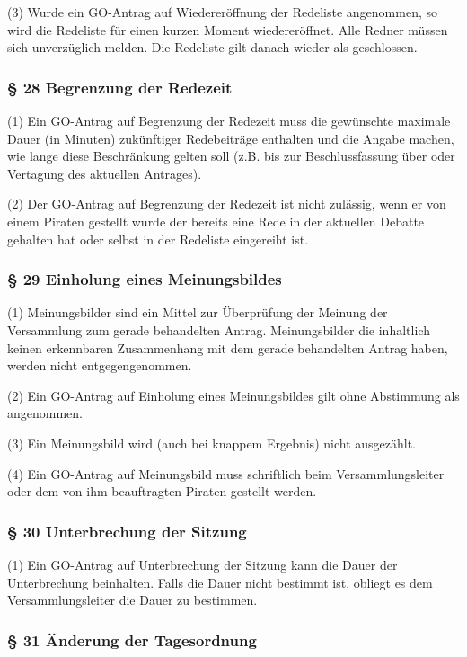 (3) Wurde ein GO-Antrag auf Wiedereröffnung der Redeliste angenommen, so
wird die Redeliste für einen kurzen Moment wiedereröffnet. Alle Redner
müssen sich unverzüglich melden. Die Redeliste gilt danach wieder als
geschlossen.

\subsubsection{§ 28 Begrenzung der Redezeit}

(1) Ein GO-Antrag auf Begrenzung der Redezeit muss die gewünschte
maximale Dauer (in Minuten) zukünftiger Redebeiträge enthalten und die
Angabe machen, wie lange diese Beschränkung gelten soll (z.B. bis zur
Beschlussfassung über oder Vertagung des aktuellen Antrages).

(2) Der GO-Antrag auf Begrenzung der Redezeit ist nicht zulässig, wenn
er von einem Piraten gestellt wurde der bereits eine Rede in der
aktuellen Debatte gehalten hat oder selbst in der Redeliste eingereiht
ist.

\subsubsection{§ 29 Einholung eines Meinungsbildes}

(1) Meinungsbilder sind ein Mittel zur Überprüfung der Meinung der
Versammlung zum gerade behandelten Antrag. Meinungsbilder die inhaltlich
keinen erkennbaren Zusammenhang mit dem gerade behandelten Antrag haben,
werden nicht entgegengenommen.

(2) Ein GO-Antrag auf Einholung eines Meinungsbildes gilt ohne
Abstimmung als angenommen.

(3) Ein Meinungsbild wird (auch bei knappem Ergebnis) nicht ausgezählt.

(4) Ein GO-Antrag auf Meinungsbild muss schriftlich beim
Versammlungsleiter oder dem von ihm beauftragten Piraten gestellt
werden.

\subsubsection{§ 30 Unterbrechung der Sitzung}

(1) Ein GO-Antrag auf Unterbrechung der Sitzung kann die Dauer der
Unterbrechung beinhalten. Falls die Dauer nicht bestimmt ist, obliegt es
dem Versammlungsleiter die Dauer zu bestimmen.

\subsubsection{§ 31 Änderung der Tagesordnung}

